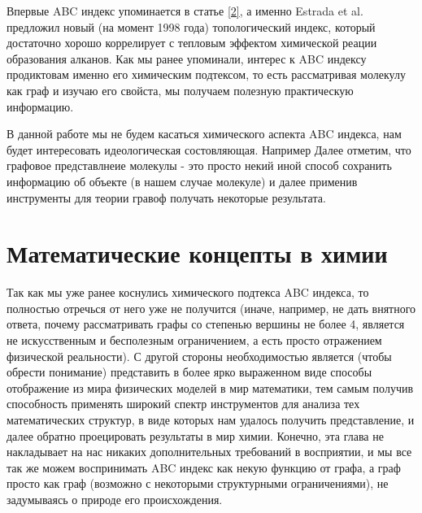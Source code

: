 \documentclass{article}
\begin{document}
Впервые ABC индекс упоминается в статье \hyperlink{fisrt_mention}{[2]}, а именно Estrada et al. предложил новый (на момент 1998 года) топологический индекс, который достаточно хорошо коррелирует с тепловым эффектом химической реации образования алканов. Как мы ранее упоминали, интерес к ABC индексу продиктовам именно его химическим подтексом, то есть рассматривая молекулу как граф и изучаю его свойста, мы получаем полезную практическую информацию.


В данной работе мы не будем касаться химического аспекта ABC индекса, нам будет интересовать идеологическая состовляющая. Например
Далее отметим, что графовое представлнеие молекулы - это просто некий иной способ сохранить информацию об объекте (в нашем случае молекуле) и далее применив инструменты для теории гравоф получать некоторые результата.


\newpage

\section{Математические концепты в химии}
Так как мы уже ранее коснулись химического подтекса ABC индекса, то полностью отречься от него уже не получится (иначе, например, не дать внятного ответа, почему рассматривать графы со степенью вершины не более 4, является не искусственным и бесполезным ограничением, а есть просто отражением физической реальности). С другой стороны необходимостью является (чтобы обрести понимание) представить в более ярко выраженном виде способы отображение из мира физических моделей в мир математики, тем самым получив способность применять широкий спектр инструментов для анализа тех математических структур, в виде которых нам удалось получить представление, и далее обратно проецировать результаты в мир химии. Конечно, эта глава не накладывает на нас никаких дополнительных требований в восприятии, и мы все так же можем воспринимать ABC индекс как некую функцию от графа, а граф просто как граф (возможно с некоторыми структурными ограничениями), не задумываясь о природе его происхождения.
\end{document}
